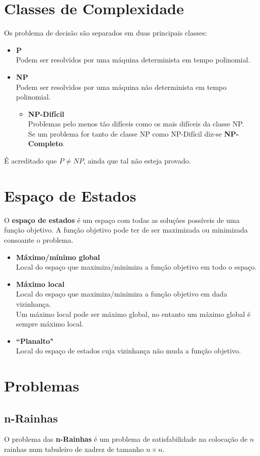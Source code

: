\documentclass[]{report}
\begin{document}
\section{Classes de Complexidade}
Os problema de decisão são separados em duas principais classes:
\begin{itemize}
	\item \textbf{P}\\
	Podem ser resolvidos por uma máquina determinista em tempo polinomial.
	\item \textbf{NP}\\
	Podem ser resolvidos por uma máquina não determinista em tempo polinomial.
	\begin{itemize}
		\item \textbf{NP-Difícil}\\
		Problemas pelo menos tão difíceis como os mais difíceis da classe NP.\\
		Se um problema for tanto de classe NP como NP-Difícil diz-se \textbf{NP-Completo}.
	\end{itemize}
\end{itemize}
É acreditado que $P \neq NP$, ainda que tal não esteja provado.
\section{Espaço de Estados}
O \textbf{espaço de estados} é um espaço com todas as soluções possíveis de uma função objetivo. A função objetivo pode ter de ser maximizada ou minimizada consoante o problema.
\begin{itemize}
	\item \textbf{Máximo/mínimo global}\\
	Local do espaço que maximiza/minimiza a função objetivo em todo o espaço.
	\item \textbf{Máximo local}\\
	Local do espaço que maximiza/minimiza a função objetivo em dada vizinhança.\\
	Um máximo local pode ser máximo global, no entanto um máximo global é sempre máximo local.
	\item \textbf{``Planalto"}\\
	Local do espaço de estados cuja vizinhança não muda a função objetivo.
\end{itemize}
\section{Problemas}
\subsection{n-Rainhas}
O problema das \textbf{n-Rainhas} é um problema de satisfabilidade na colocação de $n$ rainhas num tabuleiro de xadrez de tamanho $n \times n$.
\end{document}
